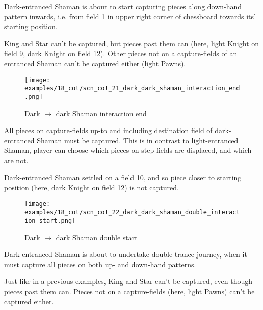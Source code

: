 Dark-entranced Shaman is about to start capturing pieces along down-hand pattern inwards,
i.e. from field 1 in upper right corner of chessboard towards its' starting position.

King and Star can't be captured, but pieces past them can (here, light Knight on field 9,
dark Knight on field 12). Other pieces not on a capture-fields of an entranced Shaman can't
be captured either (light Pawns).

\clearpage %

\noindent
\begin{figure}[!h]
\texttt{[image: examples/18\_cot/scn\_cot\_21\_dark\_dark\_shaman\_interaction\_end.png]}
\caption{Dark $\rightarrow$ dark Shaman interaction end}
\label{fig:scn_cot_21_dark_dark_shaman_interaction_end}
\end{figure}

All pieces on capture-fields up-to and including destination field of dark-entranced Shaman
must be captured. This is in contrast to light-entranced Shaman, player can choose which
pieces on step-fields are displaced, and which are not.

Dark-entranced Shaman settled on a field 10, and so piece closer to starting position (here,
dark Knight on field 12) is not captured.

\clearpage %

\noindent
\begin{figure}[!h]
\texttt{[image: examples/18\_cot/scn\_cot\_22\_dark\_dark\_shaman\_double\_interaction\_start.png]}
\caption{Dark $\rightarrow$ dark Shaman double start}
\label{fig:scn_cot_22_dark_dark_shaman_double_interaction_start}
\end{figure}

Dark-entranced Shaman is about to undertake double trance-journey, when it must capture all
pieces on both up- and down-hand patterns.

Just like in a previous examples, King and Star can't be captured, even though pieces past
them can. Pieces not on a capture-fields (here, light Pawns) can't be captured either.

\clearpage %

